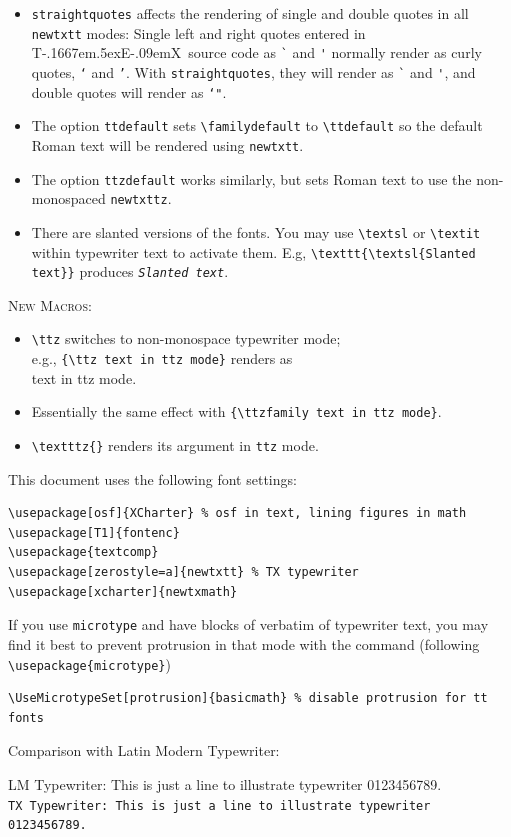 \documentclass[11pt]{article}
\makeatletter
\def\TeX{T\kern-.1667em\lower.5ex\hbox{E}\kern-.09emX\@}
\makeatother
\begin{document}
\begin{itemize}
\item
{\tt straightquotes} affects the rendering of single and double quotes in all {\tt newtxtt} modes:
Single left and right quotes entered in \TeX\ source code as \verb|`| and \verb|'| normally render as curly quotes, {\tt `} and {\tt '}. With {\tt straightquotes}, they will render as \verb|`| and \verb|'|, and double quotes will render as {\tt \char`"}.
\item The option {\tt ttdefault} sets \verb|\familydefault| to \verb|\ttdefault| so the default Roman text will be rendered using {\tt newtxtt}. 
\item The option {\tt ttzdefault} works similarly, but sets Roman text to use the non-monospaced  {\tt newtxttz}.
\item There are slanted versions of the fonts. You may use \verb|\textsl| or \verb|\textit| within typewriter text to activate them. E.g, \verb|\texttt{\textsl{Slanted text}}| produces \texttt{\textsl{Slanted text}}.
\end{itemize}
\textsc{New Macros:}
\begin{itemize}
\item
\verb|\ttz| switches to non-monospace typewriter mode; \\
e.g., \verb|{\ttz text in ttz mode}| renders as \\
{\ttz text in ttz mode}.
\item Essentially the same effect with \verb|{\ttzfamily text in ttz mode}|.
\item \verb|\textttz{}| renders its argument in {\tt ttz} mode.
\end{itemize}

This document uses the following font settings:
\begin{verbatim}
\usepackage[osf]{XCharter} % osf in text, lining figures in math
\usepackage[T1]{fontenc}
\usepackage{textcomp}
\usepackage[zerostyle=a]{newtxtt} % TX typewriter
\usepackage[xcharter]{newtxmath}
\end{verbatim}

If you use {\tt microtype} and have blocks of verbatim of typewriter text, you may find it best to prevent protrusion in that mode with the command (following \verb|\usepackage{microtype}|)\begin{verbatim}
\UseMicrotypeSet[protrusion]{basicmath} % disable protrusion for tt fonts
\end{verbatim}

Comparison with Latin Modern Typewriter: 

{\fontsize{11.22pt}{13}\selectfont LM Typewriter: This is just a line to illustrate typewriter 0123456789.}\\
\texttt{TX Typewriter: This is just a line to illustrate typewriter 0123456789.}\\
\end{document}
